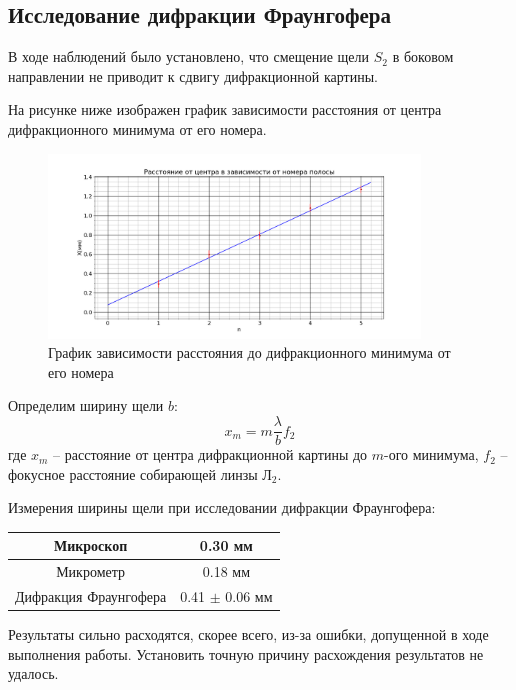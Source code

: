 \subsection*{Исследование дифракции Фраунгофера}

В ходе наблюдений было установлено, что смещение щели $S_2$ в боковом 
направлении не приводит к сдвигу дифракционной картины.

На рисунке ниже изображен график зависимости расстояния от центра 
дифракционного минимума от его номера.

\begin{figure}[H]
	\centering
	\includegraphics[width=0.88\textwidth]{../Изображения/X_n.png}
	\caption{График зависимости расстояния до дифракционного минимума от его 
	номера}
\end{figure}

Определим ширину щели $b$:
$$
x_m = m \frac{\lambda}{b} f_2
$$
где $x_m$ -- расстояние от центра дифракционной картины до $m$-ого минимума, 
$f_2$ -- фокусное расстояние собирающей линзы $Л_2$.

Измерения ширины щели при исследовании дифракции Фраунгофера:\\

\begin{tabular}{|c|c|}
	\hline
	Микроскоп & 0.30 мм \\
	\hline
	Микрометр & 0.18 мм \\
	\hline
	Дифракция Фраунгофера & 0.41 $\pm$ 0.06 мм \\
	\hline
\end{tabular}

Результаты сильно расходятся, скорее всего, из-за ошибки, допущенной в ходе 
выполнения работы. Установить точную причину расхождения результатов не удалось.